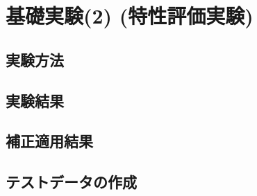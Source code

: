 \section{基礎実験(2) (特性評価実験)}

\subsection{実験方法}

\subsection{実験結果}

\subsection{補正適用結果}

\subsection{テストデータの作成}
